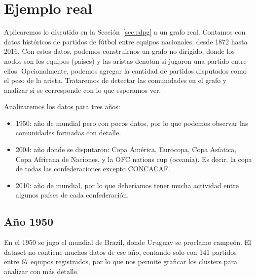\documentclass{article}
\begin{document}
\section{Ejemplo real}

Aplicaremos lo discutido en la Sección~\ref{sec:rdpg} a un grafo real. Contamos con datos históricos de partidos de fútbol entre equipos nacionales, desde 1872
hasta 2016. Con estos datos, podemos construirnos un grafo no dirigido, donde los nodos son los equipos (países) y las aristas denotan si jugaron una partido entre ellos.
Opcionalmente, podemos agregar la cantidad de partidos disputados como el peso de la arista. Trataremos de detectar las comunidades en el grafo y analizar si se corresponde con lo que esperamos ver.

Analizaremos los datos para tres años:
\begin{itemize}
    \item 1950: año de mundial pero con pocos datos, por lo que podemos observar las comunidades formadas con detalle.
    \item 2004: año donde se disputaron: Copa América, Eurocopa, Copa Asíatica, Copa Africana de Naciones, 
    y la OFC nations cup (oceanía). Es decir, la copa de todas las confederaciones excepto CONCACAF.
    \item 2010: año de mundial, por lo que deberíamos tener mucha actividad entre algunos países de cada confederación.
\end{itemize}

\subsection{Año 1950}

En el 1950 se jugo el mundial de Brazil, donde Uruguay se proclamo campeón. El dataset no contiene muchos datos de ese año, contando solo con 141 partidos entre 67 equipos registrados, por lo que
nos permite graficar los clusters para analizar con más detalle.
\end{document}
